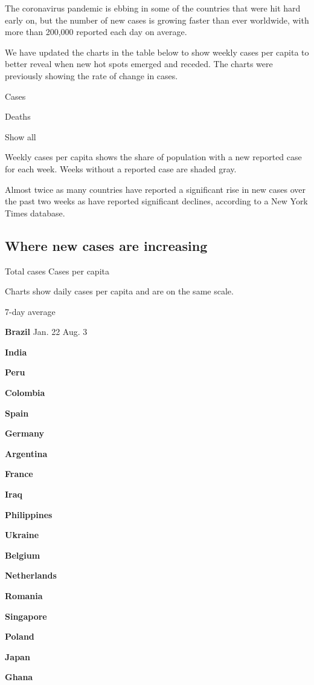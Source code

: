 The coronavirus pandemic is ebbing in some of the countries that were
hit hard early on, but the number of new cases is growing faster than
ever worldwide, with more than 200,000 reported each day on average.

We have updated the charts in the table below to show weekly cases per
capita to better reveal when new hot spots emerged and receded. The
charts were previously showing the rate of change in cases.

Cases

Deaths

Show all

Weekly cases per capita shows the share of population with a new
reported case for each week. Weeks without a reported case are shaded
gray.

Almost twice as many countries have reported a significant rise in new
cases over the past two weeks as have reported significant declines,
according to a New York Times database.

\hypertarget{where-new-cases-are-increasing}{%
\subsection{Where new cases are
increasing}\label{where-new-cases-are-increasing}}

Total cases Cases per capita

Charts show daily cases per capita and are on the same scale.

7-day average

\textbf{Brazil} Jan. 22 Aug. 3

\textbf{India}

\textbf{Peru}

\textbf{Colombia}

\textbf{Spain}

\textbf{Germany}

\textbf{Argentina}

\textbf{France}

\textbf{Iraq}

\textbf{Philippines}

\textbf{Ukraine}

\textbf{Belgium}

\textbf{Netherlands}

\textbf{Romania}

\textbf{Singapore}

\textbf{Poland}

\textbf{Japan}

\textbf{Ghana}


